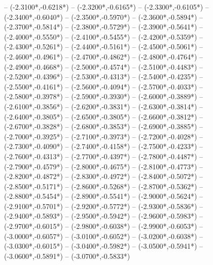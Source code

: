 {	-- ({-2.3100*\dx},{-0.6218*\dy})
	-- ({-2.3200*\dx},{-0.6165*\dy})
	-- ({-2.3300*\dx},{-0.6105*\dy})
	-- ({-2.3400*\dx},{-0.6040*\dy})
	-- ({-2.3500*\dx},{-0.5970*\dy})
	-- ({-2.3600*\dx},{-0.5894*\dy})
	-- ({-2.3700*\dx},{-0.5814*\dy})
	-- ({-2.3800*\dx},{-0.5729*\dy})
	-- ({-2.3900*\dx},{-0.5641*\dy})
	-- ({-2.4000*\dx},{-0.5550*\dy})
	-- ({-2.4100*\dx},{-0.5455*\dy})
	-- ({-2.4200*\dx},{-0.5359*\dy})
	-- ({-2.4300*\dx},{-0.5261*\dy})
	-- ({-2.4400*\dx},{-0.5161*\dy})
	-- ({-2.4500*\dx},{-0.5061*\dy})
	-- ({-2.4600*\dx},{-0.4961*\dy})
	-- ({-2.4700*\dx},{-0.4862*\dy})
	-- ({-2.4800*\dx},{-0.4764*\dy})
	-- ({-2.4900*\dx},{-0.4668*\dy})
	-- ({-2.5000*\dx},{-0.4574*\dy})
	-- ({-2.5100*\dx},{-0.4483*\dy})
	-- ({-2.5200*\dx},{-0.4396*\dy})
	-- ({-2.5300*\dx},{-0.4313*\dy})
	-- ({-2.5400*\dx},{-0.4235*\dy})
	-- ({-2.5500*\dx},{-0.4161*\dy})
	-- ({-2.5600*\dx},{-0.4094*\dy})
	-- ({-2.5700*\dx},{-0.4033*\dy})
	-- ({-2.5800*\dx},{-0.3978*\dy})
	-- ({-2.5900*\dx},{-0.3930*\dy})
	-- ({-2.6000*\dx},{-0.3889*\dy})
	-- ({-2.6100*\dx},{-0.3856*\dy})
	-- ({-2.6200*\dx},{-0.3831*\dy})
	-- ({-2.6300*\dx},{-0.3814*\dy})
	-- ({-2.6400*\dx},{-0.3805*\dy})
	-- ({-2.6500*\dx},{-0.3805*\dy})
	-- ({-2.6600*\dx},{-0.3812*\dy})
	-- ({-2.6700*\dx},{-0.3828*\dy})
	-- ({-2.6800*\dx},{-0.3853*\dy})
	-- ({-2.6900*\dx},{-0.3885*\dy})
	-- ({-2.7000*\dx},{-0.3925*\dy})
	-- ({-2.7100*\dx},{-0.3973*\dy})
	-- ({-2.7200*\dx},{-0.4028*\dy})
	-- ({-2.7300*\dx},{-0.4090*\dy})
	-- ({-2.7400*\dx},{-0.4158*\dy})
	-- ({-2.7500*\dx},{-0.4233*\dy})
	-- ({-2.7600*\dx},{-0.4313*\dy})
	-- ({-2.7700*\dx},{-0.4397*\dy})
	-- ({-2.7800*\dx},{-0.4487*\dy})
	-- ({-2.7900*\dx},{-0.4579*\dy})
	-- ({-2.8000*\dx},{-0.4675*\dy})
	-- ({-2.8100*\dx},{-0.4773*\dy})
	-- ({-2.8200*\dx},{-0.4872*\dy})
	-- ({-2.8300*\dx},{-0.4972*\dy})
	-- ({-2.8400*\dx},{-0.5072*\dy})
	-- ({-2.8500*\dx},{-0.5171*\dy})
	-- ({-2.8600*\dx},{-0.5268*\dy})
	-- ({-2.8700*\dx},{-0.5362*\dy})
	-- ({-2.8800*\dx},{-0.5454*\dy})
	-- ({-2.8900*\dx},{-0.5541*\dy})
	-- ({-2.9000*\dx},{-0.5624*\dy})
	-- ({-2.9100*\dx},{-0.5701*\dy})
	-- ({-2.9200*\dx},{-0.5772*\dy})
	-- ({-2.9300*\dx},{-0.5836*\dy})
	-- ({-2.9400*\dx},{-0.5893*\dy})
	-- ({-2.9500*\dx},{-0.5942*\dy})
	-- ({-2.9600*\dx},{-0.5983*\dy})
	-- ({-2.9700*\dx},{-0.6015*\dy})
	-- ({-2.9800*\dx},{-0.6038*\dy})
	-- ({-2.9900*\dx},{-0.6053*\dy})
	-- ({-3.0000*\dx},{-0.6057*\dy})
	-- ({-3.0100*\dx},{-0.6052*\dy})
	-- ({-3.0200*\dx},{-0.6038*\dy})
	-- ({-3.0300*\dx},{-0.6015*\dy})
	-- ({-3.0400*\dx},{-0.5982*\dy})
	-- ({-3.0500*\dx},{-0.5941*\dy})
	-- ({-3.0600*\dx},{-0.5891*\dy})
	-- ({-3.0700*\dx},{-0.5833*\dy})
}
